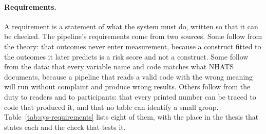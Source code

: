 \paragraph{Requirements.} A requirement is a statement of what the system
must do, written so that it can be checked. The pipeline's requirements come
from two sources. Some follow from the theory: that outcomes never enter
measurement, because a construct fitted to the outcomes it later predicts is a
risk score and not a construct. Some follow from the data: that every variable
name and code matches what NHATS documents, because a pipeline that reads a
valid code with the wrong meaning will run without complaint and produce wrong
results. Others follow from the duty to readers and to participants: that every
printed number can be traced to code that produced it, and that no table can
identify a small group. Table~\ref{tab:sys-requirements} lists eight of them,
with the place in the thesis that states each and the check that tests it.

